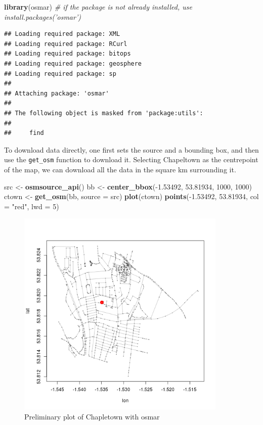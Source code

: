 \documentclass[]{article}
\newenvironment{Shaded}{}{}
\newcommand{\KeywordTok}[1]{\textcolor[rgb]{0.00,0.44,0.13}{\textbf{{#1}}}}
\newcommand{\DataTypeTok}[1]{\textcolor[rgb]{0.56,0.13,0.00}{{#1}}}
\newcommand{\DecValTok}[1]{\textcolor[rgb]{0.25,0.63,0.44}{{#1}}}
\newcommand{\FloatTok}[1]{\textcolor[rgb]{0.25,0.63,0.44}{{#1}}}
\newcommand{\StringTok}[1]{\textcolor[rgb]{0.25,0.44,0.63}{{#1}}}
\newcommand{\CommentTok}[1]{\textcolor[rgb]{0.38,0.63,0.69}{\textit{{#1}}}}
\newcommand{\NormalTok}[1]{{#1}}
\let\Oldincludegraphics\includegraphics
\renewcommand{\includegraphics}[1]{\Oldincludegraphics[width=10cm]{#1}}
\begin{document}
\begin{Shaded}
\begin{Highlighting}[]
\KeywordTok{library}\NormalTok{(osmar)  }\CommentTok{# if the package is not already installed, use install.packages('osmar')}
\end{Highlighting}
\end{Shaded}
\begin{verbatim}
## Loading required package: XML
## Loading required package: RCurl
## Loading required package: bitops
## Loading required package: geosphere
## Loading required package: sp
## 
## Attaching package: 'osmar'
## 
## The following object is masked from 'package:utils':
## 
##     find
\end{verbatim}
To download data directly, one first sets the source and a bounding box,
and then use the \texttt{get\_osm} function to download it. Selecting
Chapeltown as the centrepoint of the map, we can download all the data
in the square km surrounding it.

\begin{Shaded}
\begin{Highlighting}[]
\NormalTok{src <- }\KeywordTok{osmsource_api}\NormalTok{()}
\NormalTok{bb <- }\KeywordTok{center_bbox}\NormalTok{(-}\FloatTok{1.53492}\NormalTok{, }\FloatTok{53.81934}\NormalTok{, }\DecValTok{1000}\NormalTok{, }\DecValTok{1000}\NormalTok{)}
\NormalTok{ctown <- }\KeywordTok{get_osm}\NormalTok{(bb, }\DataTypeTok{source =} \NormalTok{src)}
\KeywordTok{plot}\NormalTok{(ctown)}
\KeywordTok{points}\NormalTok{(-}\FloatTok{1.53492}\NormalTok{, }\FloatTok{53.81934}\NormalTok{, }\DataTypeTok{col =} \StringTok{"red"}\NormalTok{, }\DataTypeTok{lwd =} \DecValTok{5}\NormalTok{)}
\end{Highlighting}
\end{Shaded}
\begin{figure}[htbp]
\centering
\includegraphics{figure/Preliminary_plot_of_Chapletown_with_osmar.png}
\caption{Preliminary plot of Chapletown with osmar}
\end{figure}
\end{document}
